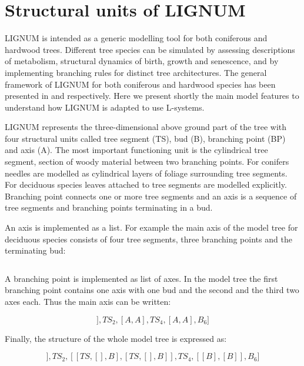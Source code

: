 \section{Structural units of LIGNUM}
LIGNUM is intended as a generic modelling tool for both coniferous and
hardwood trees.  Different tree  species can be simulated by assessing
descriptions of  metabolism, structural dynamics of  birth, growth and
senescence,  and by  implementing  branching rules  for distinct  tree
architectures.  The  general framework  of LIGNUM for  both coniferous
and hardwood  species has  been presented in  \citet{perttunen:96} and
\citet{perttunen:01} respectively.   Here we present  shortly the main
model features to understand how LIGNUM is adapted to use L-systems.

LIGNUM represents the three-dimensional  above ground part of the tree
with  four  structural  units  called  tree  segment  (TS),  bud  (B),
branching point (BP) and axis (A). The most important functioning unit
is the cylindrical tree segment, section of woody material between two
branching points.   For conifers  needles are modelled  as cylindrical
layers of  foliage surrounding  tree segments.  For  deciduous species
leaves attached  to tree segments are  modelled explicitly. Branching
point connects one or more tree  segments and an axis is a sequence of
tree segments and branching points terminating in a bud.

An axis  is implemented as  a list. For  example the main axis  of the
model  tree for  deciduous species  consists of  four  tree segments,
three branching points and the terminating bud:

\begin{equation}
[TS_0,BP_1,TS_2,BP_3,TS_4,BP_5,B_6]
\end{equation}

A branching point is implemented as list  of axes. In the model tree the
first branching  point contains one axis  with one bud  and the second
and the third two axes each. Thus the main axis can be written:

\begin{equation}
[TS_0,[[B]],TS_2,[A,A],TS_4,[A,A],B_6]
\end{equation}

Finally, the structure of the whole model tree is expressed as:

\begin{equation}
[TS_0,[[B]],TS_2,[[TS,[],B],[TS,[],B]],TS_4,[[B],[B]],B_6]
\end{equation}

